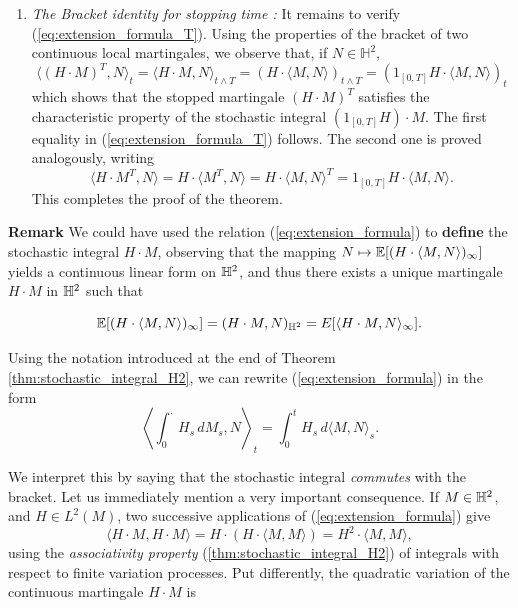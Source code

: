 \documentclass[../Main.tex]{subfiles}
\begin{document}
{\begin{enumerate}
\begin{itemize}
$$        $$
        \item  It is easy to see that (\ref{eq:extension_formula}) characterizes $H \cdot M$ among the martingales of $\mathbb{H}^2$. Indeed, if $X$ is another martingale of $\mathbb{H}^2$ that satisfies the same identity, we get, for every $N \in \mathbb{H}^2$,
        $$ \langle H \cdot M - X, N \rangle = 0. $$
        Taking $N = H \cdot M - X$ and using Theorem \ref{thm:tot_var_local_martingal} we obtain that $X = H \cdot M$.
    \end{itemize}
    \item \textit{The Bracket identity for stopping time :} It remains to verify (\ref{eq:extension_formula_T}). Using the properties of the bracket of two continuous local martingales, we observe that, if $N \in \mathbb{H}^2$, 
    $$
    \langle (H \cdot M)^T, N \rangle_t = \langle H \cdot M, N \rangle_{t \wedge T} = (H \cdot \langle M, N \rangle)_{t \wedge T} = (1_{[0,T]} H \cdot \langle M, N \rangle)_t
    $$
    which shows that the stopped martingale $(H \cdot M)^T$ satisfies the characteristic property of the stochastic integral $(1_{[0,T]} H) \cdot M$. The first equality in (\ref{eq:extension_formula_T}) follows. The second one is proved analogously, writing
    $$
    \langle H \cdot M^T, N \rangle = H \cdot \langle M^T, N \rangle = H \cdot \langle M, N \rangle^T = 1_{[0,T]} H \cdot \langle M, N \rangle.
    $$
    This completes the proof of the theorem.
\end{enumerate}

}

\textbf{Remark} We could have used the relation (\ref{eq:extension_formula}) to \textbf{define} the stochastic integral $H \cdot M$, observing that the mapping $N \mapsto \mathbb{E}[(H \cdot \langle M, N \rangle)_\infty]$ yields a continuous linear form on $\mathbb{H}^2$, and thus there exists a unique martingale $H \cdot M$ in $\mathbb{H}^2$ such that


$$\mathbb{E}[(H \cdot \langle M, N \rangle)_\infty] = (H \cdot M, N)_{\mathbb{H}^2} = E[\langle H \cdot M, N \rangle_\infty].$$

Using the notation introduced at the end of Theorem \ref{thm:stochastic_integral_H2}, we can rewrite (\ref{eq:extension_formula}) in the form
$$\left\langle \int_0^\cdot H_s \, dM_s, N \right\rangle_t = \int_0^t H_s \, d\langle M, N \rangle_s.$$

We interpret this by saying that the stochastic integral \textit{commutes} with the bracket. Let us immediately mention a very important consequence. If $M \in \mathbb{H}^2$, and $H \in L^2(M)$, two successive applications of (\ref{eq:extension_formula}) give
$$\langle H \cdot M, H \cdot M \rangle = H \cdot (H \cdot \langle M, M \rangle) = H^2 \cdot \langle M, M \rangle,$$
using the \textit{associativity property} (\ref{thm:stochastic_integral_H2}) of integrals with respect to finite variation processes. Put differently, the quadratic variation of the continuous martingale $H \cdot M$ is
\end{document}
